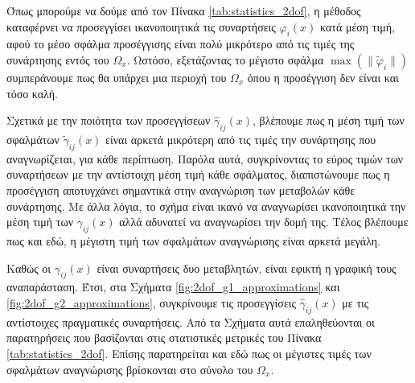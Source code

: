Όπως μπορούμε να δούμε από τον Πίνακα \ref{tab:statistics_2dof}, η μέθοδος καταφέρνει να προσεγγίσει ικανοποιητικά τις συναρτήσεις $\varphi_i(x)$ κατά μέση τιμή, αφού το μέσο σφάλμα προσέγγισης είναι πολύ μικρότερο από τις τιμές της συνάρτησης εντός του $\Omega_x$. Ωστόσο, εξετάζοντας το μέγιστο σφάλμα $\max(\| \tilde{\varphi}_i \| )$ συμπεράνουμε πως θα υπάρχει μια περιοχή του $\Omega_x$ όπου η προσέγγιση δεν είναι και τόσο καλή.

Σχετικά με την ποιότητα των προσεγγίσεων $\hat{\gamma}_{ij}(x)$, βλέπουμε πως η μέση τιμή των σφαλμάτων $\tilde{\gamma}_{ij}(x)$ είναι αρκετά μικρότερη από τις τιμές την συνάρτησης που αναγνωρίζεται, για κάθε περίπτωση. Παρόλα αυτά, συγκρίνοντας το εύρος τιμών των συναρτήσεων με την αντίστοιχη μέση τιμή κάθε σφάλματος, διαπιστώνουμε πως η προσέγγιση αποτυγχάνει σημαντικά στην αναγνώριση των μεταβολών κάθε συνάρτησης. Με άλλα λόγια, το σχήμα είναι ικανό να αναγνωρίσει ικανοποιητικά την μέση τιμή των $\gamma_{ij}(x)$ αλλά αδυνατεί να αναγνωρίσει την δομή της. Τέλος βλέπουμε πως και εδώ, η μέγιστη τιμή των σφαλμάτων αναγνώρισης είναι αρκετά μεγάλη. 

Καθώς οι $\gamma_{ij}(x)$ είναι συναρτήσεις δυο μεταβλητών, είναι εφικτή η γραφική τους αναπαράσταση. Έτσι, στα Σχήματα \ref{fig:2dof_g1_approximations} και \ref{fig:2dof_g2_approximations}, συγκρίνουμε τις προσεγγίσεις $\hat{\gamma}_{ij}(x)$ με τις αντίστοιχες πραγματικές συναρτήσεις. Από τα Σχήματα αυτά επαληθεύονται οι παρατηρήσεις που βασίζονται στις στατιστικές μετρικές του Πίνακα \ref{tab:statistics_2dof}. Επίσης παρατηρείται και εδώ πως οι μέγιστες τιμές των σφαλμάτων αναγνώρισης βρίσκονται στο σύνολο του $\Omega_x$.


